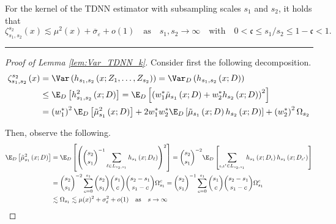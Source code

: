 \newpage
\begin{lem}\label{lem:Var_TDNN_k}
	For the kernel of the TDNN estimator with subsampling scales $s_1$ and $s_2$, it holds that
	\begin{equation}
		\zeta_{s_1, s_2}^{s_2}\left(x\right)
		\lesssim \mu^2(x) + \overline{\sigma}_{\varepsilon} + o(1)
		\quad \text{as} \quad s_1, s_2 \rightarrow \infty
		\quad \text{with} \quad
		0 < \mathfrak{c} \leq s_1 / s_2 \leq 1 - \mathfrak{c} < 1.
	\end{equation}
\end{lem}
\hrule
\begin{proof}[Proof of Lemma \ref{lem:Var_TDNN_k}]
	Consider first the following decomposition.
	\begin{equation}
		\begin{aligned}
			\zeta_{s_1, s_2}^{s_2}\left(x\right)
			 & = \Var\left(h_{s_1, s_2}\left(x; Z_1, \ldots, Z_{s_2}\right)\right)
			= \Var_{D}\left(h_{s_1, s_2}\left(x; D\right)\right)                                     \\
			 & \leq \E_{D}\left[h_{s_1, s_2}^{2}\left(x; D\right)\right]
			= \E_{D}\left[
				\left(w_{1}^{*}\tilde{\mu}_{s_1}\left(x; D\right) + w_{2}^{*} h_{s_2}\left(x; D\right)\right)^2
			\right]                                                                                           \\
			 & = \left(w_{1}^{*}\right)^2\E_{D}\left[\tilde{\mu}_{s_1}^{2}\left(x; D\right)\right]
			+ 2 w_{1}^{*}w_{2}^{*} \E_{D}\left[\tilde{\mu}_{s_1}\left(x; D\right) h_{s_2}\left(x; D\right)\right]
			+ \left(w_{2}^{*}\right)^2\Omega_{s_2}
		\end{aligned}
	\end{equation}

	Then, observe the following.
	\begin{equation}
		\begin{aligned}
			\E_{D}\left[\tilde{\mu}_{s_1}^{2}\left(x; D\right)\right]
			 & = \E_D\left[\left(\binom{s_2}{s_1}^{-1}\sum_{\ell \in L_{s_2, s_1}} h_{s_1}\left(x; D_{\ell}\right)\right)^2\right]
			= \binom{s_2}{s_1}^{-2} \E_{D}\left[\sum_{\iota, \iota' \in L_{s_2, s_1}}h_{s_1}\left(x; D_{\iota}\right)h_{s_1}\left(x; D_{\iota'}\right)\right] \\
			 & = \binom{s_2}{s_1}^{-2} \sum_{c = 0}^{s_1} \binom{s_2}{s_1}\binom{s_1}{c}\binom{s_2 - s_1}{s_1 - c} \Omega_{s_1}^{c}
			= \binom{s_2}{s_1}^{-1} \sum_{c = 0}^{s_1} \binom{s_1}{c}\binom{s_2 - s_1}{s_1 - c} \Omega_{s_1}^{c}                                                                \\
			 & \lesssim \Omega_{s_1}
			\lesssim \mu(x)^2 + \sigma_{\varepsilon}^2 + o(1)
			\quad \text{as} \quad s \rightarrow \infty
		\end{aligned}
	\end{equation}


\end{proof}
